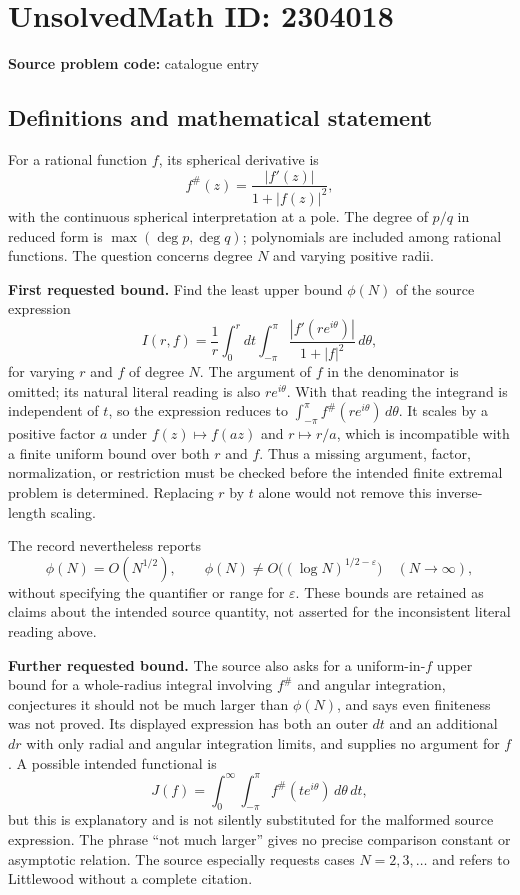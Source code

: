 \documentclass[11pt]{article}
\begin{document}
\section*{UnsolvedMath ID: 2304018}
\textbf{Source problem code:} catalogue entry
\subsection{Definitions and mathematical statement}
For a rational function $f$, its spherical derivative is
\[
 f^{\#}(z)=\frac{|f'(z)|}{1+|f(z)|^2},
\]
with the continuous spherical interpretation at a pole. The degree of $p/q$ in reduced form is $\max(\deg p,\deg q)$; polynomials are included among rational functions. The question concerns degree $N$ and varying positive radii.

\textbf{First requested bound.} Find the least upper bound $\phi(N)$ of the source expression
\[
 I(r,f)=\frac1r\int_0^r dt\int_{-\pi}^{\pi}
        \frac{|f'(re^{i\theta})|}{1+|f|^2}\,d\theta,
\]
for varying $r$ and $f$ of degree $N$. The argument of $f$ in the denominator is omitted; its natural literal reading is also $re^{i\theta}$. With that reading the integrand is independent of $t$, so the expression reduces to $\int_{-\pi}^{\pi}f^{\#}(re^{i\theta})\,d\theta$. It scales by a positive factor $a$ under $f(z)\mapsto f(az)$ and $r\mapsto r/a$, which is incompatible with a finite uniform bound over both $r$ and $f$. Thus a missing argument, factor, normalization, or restriction must be checked before the intended finite extremal problem is determined. Replacing $r$ by $t$ alone would not remove this inverse-length scaling.

The record nevertheless reports
\[
 \phi(N)=O(N^{1/2}),\qquad
 \phi(N)\ne O\bigl((\log N)^{1/2-\varepsilon}\bigr)
 \quad(N\to\infty),
\]
without specifying the quantifier or range for $\varepsilon$. These bounds are retained as claims about the intended source quantity, not asserted for the inconsistent literal reading above.

\textbf{Further requested bound.} The source also asks for a uniform-in-$f$ upper bound for a whole-radius integral involving $f^{\#}$ and angular integration, conjectures it should not be much larger than $\phi(N)$, and says even finiteness was not proved. Its displayed expression has both an outer $dt$ and an additional $dr$ with only radial and angular integration limits, and supplies no argument for $f$. A possible intended functional is
\[
 J(f)=\int_0^\infty\int_{-\pi}^{\pi}f^{\#}(te^{i\theta})\,d\theta\,dt,
\]
but this is explanatory and is not silently substituted for the malformed source expression. The phrase ``not much larger'' gives no precise comparison constant or asymptotic relation. The source especially requests cases $N=2,3,\ldots$ and refers to Littlewood without a complete citation.
\end{document}
